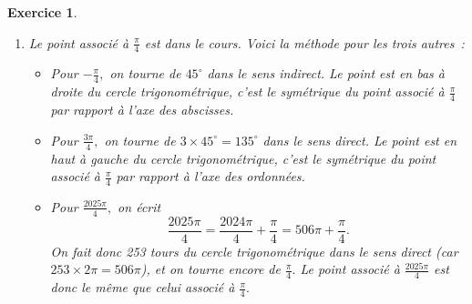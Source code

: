 \documentclass[10pt]{article}
\newtheorem{exo}{Exercice}
\begin{document}
\begin{exo}
\begin{enumerate}
\begin{multicols}{3}
$\sin \frac{\pi}{6}=\frac{1}{2}$

\columnbreak

$\cos \frac{5\pi}{6}=-\frac{\sqrt{3}}{2}$

$\sin \frac{5\pi}{6}=\frac{1}{2}$

\columnbreak

$\cos \frac{11\pi}{6}=\frac{\sqrt{3}}{2}$

$\sin \frac{11\pi}{6}=-\frac{1}{2}$

\end{multicols}



\item \begin{multicols}{2} Le point associé à $\frac{\pi} {4}$ est dans le cours. Voici la méthode pour les trois autres~:

\begin{itemize}
\item[\textbullet] Pour $-\frac{\pi} {4},$ on tourne de $45^{\circ}$ dans le sens indirect. Le point est en bas à droite du cercle trigonométrique, c'est le symétrique du point associé à $\frac{\pi}{4}$ par rapport à l'axe des abscisses.
\item[\textbullet] Pour $\frac{3\pi} {4},$ on tourne de $3\times 45^{\circ}=135^{\circ}$ dans le sens direct. Le point est en haut à gauche du cercle trigonométrique, c'est le symétrique du point associé à $\frac{\pi}{4}$ par rapport à l'axe des ordonnées.
\item[\textbullet] Pour $\frac{2025\pi}{4},$ on écrit
\[\frac{2025\pi}{4}=\frac{2024\pi}{4}+\frac{\pi}{4}=506\pi+\frac{\pi}{4}.\]
On fait donc 253 tours du cercle trigonométrique dans le sens direct (car $253\times 2\pi=506\pi$), et on tourne encore de $\frac{\pi}{4}.$ Le point associé à $\frac{2025\pi}{4}$ est donc le même que celui associé à $\frac{\pi}{4}.$
\end{itemize}



\end{multicols}
\end{enumerate}
\end{exo}
\end{document}
